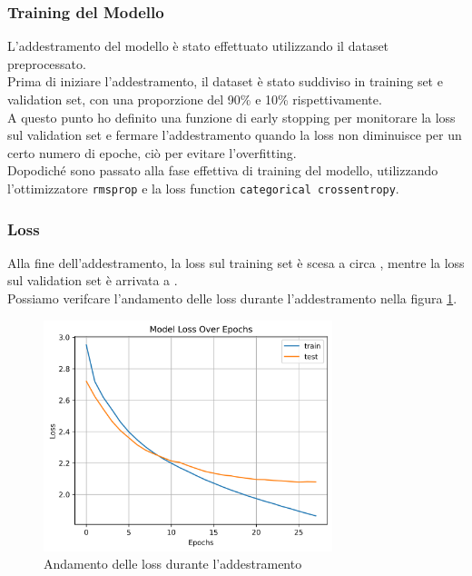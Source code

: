 \documentclass[a4paper, 12pt]{article}
\begin{document}
\subsubsection{Training del Modello}
L'addestramento del modello è stato effettuato utilizzando il dataset preprocessato.\\
Prima di iniziare l'addestramento, il dataset è stato suddiviso in training set e validation set, con una proporzione del 90\% e 10\% rispettivamente.\\
A questo punto ho definito una funzione di early stopping per monitorare la loss sul validation set e fermare l'addestramento quando la loss non diminuisce per un certo numero di epoche, ciò per evitare l'overfitting.\\
Dopodiché sono passato alla fase effettiva di training del modello, utilizzando l'ottimizzatore \texttt{rmsprop} e la loss function \texttt{categorical crossentropy}.\\

\subsubsection{Loss}
Alla fine dell'addestramento, la loss sul training set è scesa a circa , mentre la loss sul validation set è arrivata a .\\
Possiamo verifcare l'andamento delle loss durante l'addestramento nella figura \ref{fig:seq2seqlstm_loss_plot}.
\begin{figure}[H]
    \centering
    \includegraphics[width=0.75\textwidth]{media/Seq2SeqLSTM_originale_lossplot.png}
    \caption{Andamento delle loss durante l'addestramento}
    \label{fig:seq2seqlstm_loss_plot}
\end{figure}
\end{document}
